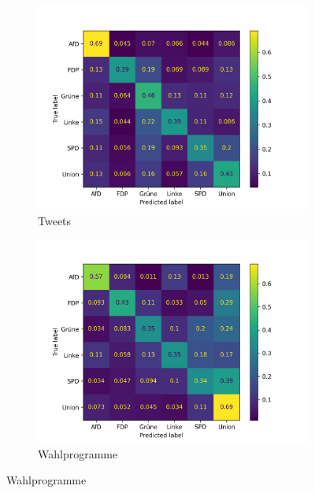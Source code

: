 \begin{figure}[H]
    \centering
    \begin{subfigure}{0.49\textwidth}
        \includegraphics[width=\textwidth]{data/images/modeling/cnn/under/tweets_confusion_matrix.png}
        \caption{Tweets}
        \label{sfig:confusionMatrixCnnTweets}
    \end{subfigure}
    \hfill
    \begin{subfigure}{0.49\textwidth}
        \includegraphics[width=\textwidth]{data/images/modeling/cnn/under/party_programs_confusion_matrix.png}
        \caption{Wahlprogramme}
        \label{sfig:confusionMatrixCnnManifest}
    \end{subfigure}
    \hfill

\end{figure}
